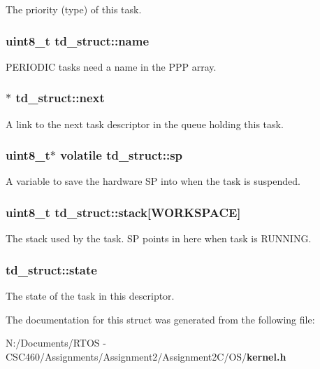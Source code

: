 The priority (type) of this task. 
\subsubsection{\setlength{\rightskip}{0pt plus 5cm}uint8\_\-t {\bf td\_\-struct::name}}\label{structtd__struct_94adae7112b2918b0b2d1f1ff131da0e}


PERIODIC tasks need a name in the PPP array. 
\subsubsection{$\ast$ {\bf td\_\-struct::next}}\label{structtd__struct_dccc3204dd053ea030dc0418494322f3}


A link to the next task descriptor in the queue holding this task. 
\subsubsection{\setlength{\rightskip}{0pt plus 5cm}uint8\_\-t$\ast$ volatile {\bf td\_\-struct::sp}}\label{structtd__struct_137edefbfb3ec1c6d9bd616451546585}


A variable to save the hardware SP into when the task is suspended. 
\subsubsection{\setlength{\rightskip}{0pt plus 5cm}uint8\_\-t {\bf td\_\-struct::stack}[WORKSPACE]}\label{structtd__struct_09bdfd0c00756120be1ca4fa644600e3}


The stack used by the task. SP points in here when task is RUNNING. 
\subsubsection{ {\bf td\_\-struct::state}}\label{structtd__struct_7ebbd3ece65b3f7487ab9602596fbc77}


The state of the task in this descriptor. 

The documentation for this struct was generated from the following file:\begin{CompactItemize}
\item 
N:/Documents/RTOS - CSC460/Assignments/Assignment2/Assignment2C/OS/{\bf kernel.h}\end{CompactItemize}

